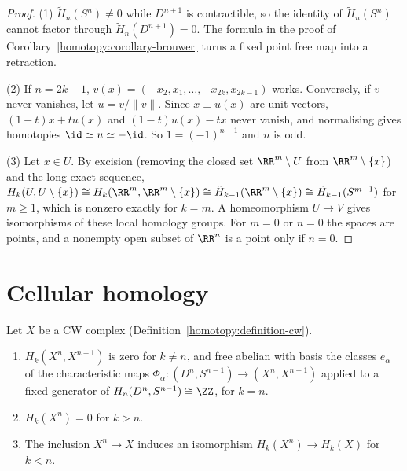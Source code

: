 \begin{proof}
(1) $\tilde{H}_n(S^n) \neq 0$ while $D^{n+1}$ is contractible, so the identity of $\tilde{H}_n(S^n)$ cannot factor through $\tilde{H}_n(D^{n+1}) = 0$. The formula in the proof
of Corollary~\ref{homotopy:corollary-brouwer} turns a fixed point free map into a retraction.

(2) If $n = 2k - 1$, $v(x) = (-x_2, x_1, \ldots, -x_{2k}, x_{2k-1})$ works. Conversely, if $v$ never vanishes, let $u = v/\|v\|$. Since $x \perp u(x)$ are unit vectors,
$(1 - t)x + tu(x)$ and $(1 - t)u(x) - tx$ never vanish, and normalising gives homotopies $\id \simeq u \simeq -\id$. So $1 = (-1)^{n+1}$ and $n$ is odd.

(3) Let $x \in U$. By excision (removing the closed set $\RR^m \setminus U$ from $\RR^m \setminus \{x\}$) and the long exact sequence,
$H_k(U, U \setminus \{x\}) \cong H_k(\RR^m, \RR^m \setminus \{x\}) \cong \tilde{H}_{k-1}(\RR^m \setminus \{x\}) \cong \tilde{H}_{k-1}(S^{m-1})$ for $m \geq 1$, which is nonzero exactly
for $k = m$. A homeomorphism $U \to V$ gives isomorphisms of these local homology groups. For $m = 0$ or $n = 0$ the spaces are points, and a nonempty open subset of
$\RR^n$ is a point only if $n = 0$.
\end{proof}

\section{Cellular homology}\label{singular-homology:section-cellular}

\begin{lemma}\label{singular-homology:lemma-cw-homology}
Let $X$ be a CW complex (Definition~\ref{homotopy:definition-cw}).
\begin{enumerate}
\item $H_k(X^n, X^{n-1})$ is zero for $k \neq n$, and free abelian with basis the classes $e_\alpha$ of the characteristic maps $\Phi_\alpha \colon (D^n, S^{n-1}) \to (X^n, X^{n-1})$
applied to a fixed generator of $H_n(D^n, S^{n-1}) \cong \ZZ$, for $k = n$.
\item $H_k(X^n) = 0$ for $k > n$.
\item The inclusion $X^n \to X$ induces an isomorphism $H_k(X^n) \to H_k(X)$ for $k < n$.
\end{enumerate}
\end{lemma}

